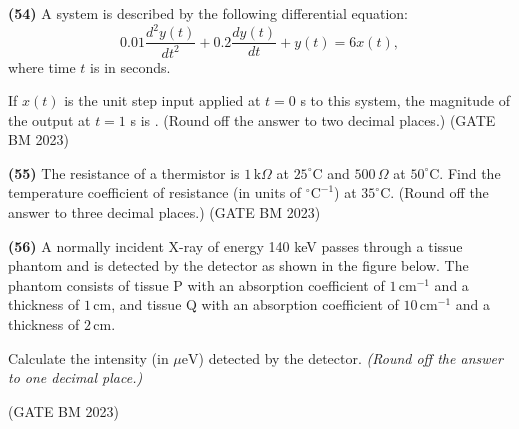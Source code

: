 \documentclass[journal]{IEEEtran}
\numberwithin{equation}{enumi}
\numberwithin{figure}{enumi}
\begin{document}
\textbf{(54)}
A system is described by the following differential equation:
\[
0.01 \frac{d^2 y(t)}{dt^2} + 0.2 \frac{dy(t)}{dt} + y(t) = 6x(t),
\]
where time \( t \) is in seconds.

If \( x(t) \) is the unit step input applied at \( t = 0 \) s to this system, the magnitude of the output at \( t = 1 \) s is \underline{\hspace{3cm}}. 
(Round off the answer to two decimal places.)
\hfill (GATE BM 2023)

\textbf{(55)} 
The resistance of a thermistor is $1 \, \text{k}\Omega$ at $25^{\circ}\text{C}$ and $500 \, \Omega$ at $50^{\circ}\text{C}$. Find the temperature coefficient of resistance (in units of $^{\circ}\text{C}^{-1}$) at $35^{\circ}\text{C}$. (Round off the answer to three decimal places.)
\hfill (GATE BM 2023)

\textbf{(56)}
A normally incident X-ray of energy 140 keV passes through a tissue phantom and is detected by the detector as shown in the figure below. The phantom consists of tissue P with an absorption coefficient of \( 1\, \text{cm}^{-1} \) and a thickness of \( 1\, \text{cm} \), and tissue Q with an absorption coefficient of \( 10\, \text{cm}^{-1} \) and a thickness of \( 2\, \text{cm} \).

Calculate the intensity (in \(\mu\text{eV}\)) detected by the detector. 
\textit{(Round off the answer to one decimal place.)}

\vspace{1em}

\begin{center}
\end{center}
\hfill (GATE BM 2023)
\end{document}
